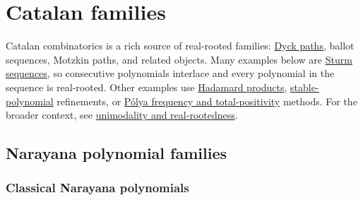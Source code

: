 


\section[realRootedCatalan]{Catalan families}

Catalan combinatorics is a rich source of real-rooted families:
\hyperref[qtCatalan]{Dyck paths}, ballot sequences, Motzkin paths, and
related objects.  Many examples below are \hyperref[sturmSequence]{Sturm
sequences}, so consecutive polynomials interlace and every polynomial in the
sequence is real-rooted.
Other examples use \hyperref[hadamardProduct]{Hadamard products},
\hyperref[stablePolynomial]{stable-polynomial} refinements, or
\hyperref[polyaFrequency]{Pólya frequency and total-positivity} methods.
For the broader context, see
\hyperref[polynomialRootIntro]{unimodality and real-rootedness}.

\subsection[narayanaPolynomialFamiliesRealRooted]{Narayana polynomial families}

\subsubsection[classicalNarayanaPolynomialsRealRooted]{Classical Narayana polynomials}

